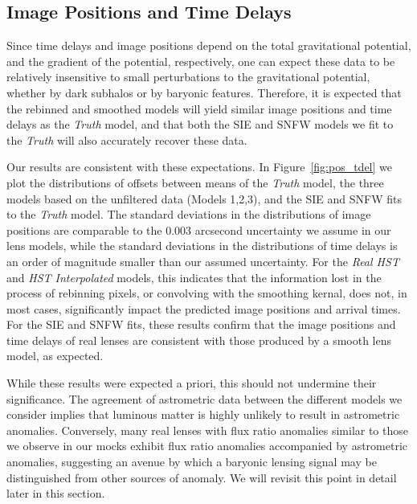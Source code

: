 \subsection{Image Positions and Time Delays}

Since time delays and image positions depend on the total
gravitational potential, and the gradient of the potential,
respectively, one can expect these data to be relatively insensitive
to small perturbations to the gravitational potential, whether by dark
subhalos or by baryonic features. Therefore, it is expected that the
rebinned and smoothed models will yield similar image positions and
time delays as the \textit{Truth} model, and that both the SIE
and SNFW models we fit to the \textit{Truth} will also
accurately recover these data.

Our results are consistent with these expectations. In Figure~\ref{fig:pos_tdel} we plot the distributions of offsets between
means of the \textit{Truth} model, the three models based on
the unfiltered data (Models 1,2,3), and the SIE and SNFW fits to the
\textit{Truth} model. The standard deviations in the
distributions of image positions are comparable to the 0.003 arcsecond
uncertainty we assume in our lens models, while the standard
deviations in the distributions of time delays is an order of
magnitude smaller than our assumed uncertainty. For the
\textit{Real HST} and \textit{HST Interpolated} models, this indicates that
the information lost in the process of rebinning pixels, or convolving
with the smoothing kernal, does not, in most cases, significantly impact the predicted image positions and arrival times. For the SIE and SNFW fits, these results confirm that the image positions and time delays of real lenses are consistent with those produced by a smooth lens model, as expected.

While these results were expected a priori, this should not undermine their significance. The agreement of astrometric data between the different models we consider implies that luminous matter is highly unlikely to result in astrometric anomalies. Conversely, many real lenses with flux ratio anomalies similar to those we observe in our mocks exhibit flux ratio anomalies accompanied by astrometric anomalies, suggesting an avenue by which a baryonic lensing signal may be distinguished from other sources of anomaly. We will revisit this point in detail later in this section.
